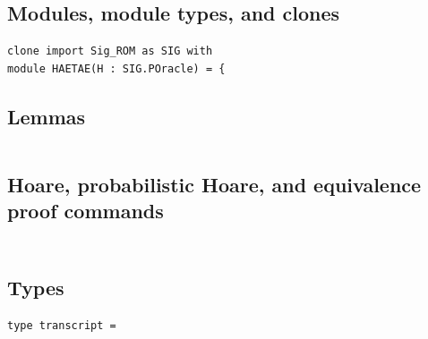 \subsection*{Modules, module types, and clones}
\begin{lstlisting}[language=EasyCrypt,basicstyle=\ttfamily\tiny]
clone import Sig_ROM as SIG with
module HAETAE(H : SIG.POracle) = {
\end{lstlisting}

\subsection*{Lemmas}
\begin{lstlisting}[language=EasyCrypt,basicstyle=\ttfamily\tiny]
\end{lstlisting}

\subsection*{Hoare, probabilistic Hoare, and equivalence proof commands}
\begin{lstlisting}[language=EasyCrypt,basicstyle=\ttfamily\tiny]
\end{lstlisting}

\section*{}

\subsection*{Types}
\begin{lstlisting}[language=EasyCrypt,basicstyle=\ttfamily\tiny]
type transcript =
\end{lstlisting}

